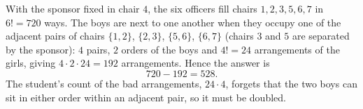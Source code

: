 With the sponsor fixed in chair $4$, the six officers fill chairs $1,2,3,5,6,7$ in $6!=720$ ways. The boys are next to one another when they occupy one of the adjacent pairs of chairs $\{1,2\}$, $\{2,3\}$, $\{5,6\}$, $\{6,7\}$ (chairs $3$ and $5$ are separated by the sponsor): $4$ pairs, $2$ orders of the boys and $4!=24$ arrangements of the girls, giving $4\cdot2\cdot24=192$ arrangements. Hence the answer is
\[
720-192=\boxed{528}.
\]
The student's count of the bad arrangements, $24\cdot4$, forgets that the two boys can sit in either order within an adjacent pair, so it must be doubled.
